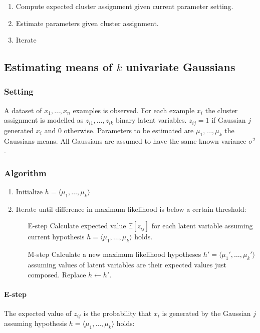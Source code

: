 	\begin{enumerate}
		\item Compute expected cluster assignment given current parameter setting.
		\item Estimate parameters given cluster assignment.
		\item Iterate
	\end{enumerate}

	\subsection{Estimating means of $k$ univariate Gaussians}

		\subsubsection{Setting}
		A dataset of $x_1,\dots,x_n$ examples is observed.
		For each example $x_i$ the cluster assignment is modelled as $z_{i1}, \dots, z_{ik}$ binary latent variables.
		$z_{ij}=1$ if Gaussian $j$ generated $x_{i}$ and $0$ otherwise.
		Parameters to be estimated are $\mu_1, \dots,\mu_k$ the Gaussians means.
		All Gaussians are assumed to have the same known variance $\sigma^2$.

		\subsubsection{Algorithm}

		\begin{enumerate}
			\item Initialize $h = \langle\mu_1,\dots,\mu_k\rangle$
			\item Iterate until difference in maximum likelihood is below a certain threshold:

				\begin{itemize}
					\item[E-step] Calculate expected value $\mathbb{E}[z_{ij}]$ for each latent variable assuming current hypothesis $h = \langle \mu_1, \dots,\mu_k\rangle$ holds.
					\item[M-step] Calculate a new maximum likelihood hypotheses $h' = \langle\mu_1',\dots,\mu_k'\rangle$ assuming values of latent variables are their expected values just composed.
						Replace $h\leftarrow h'$.
				\end{itemize}
		\end{enumerate}

			\paragraph{E-step}
			The expected value of $z_{ij}$ is the probability that $x_i$ is generated by the Gaussian $j$ assuming hypothesis $h = \langle\mu_1,\dots,\mu_k\rangle$ holds:

